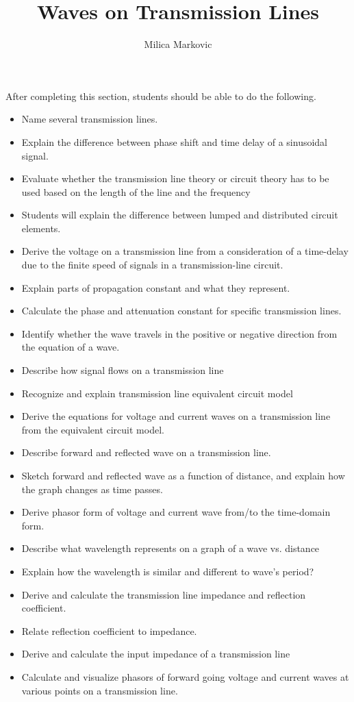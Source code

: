 \documentclass{ximera}
\title{Waves on Transmission Lines}
\author{Milica Markovic}
\begin{document}
\begin{abstract}
\end{abstract}

\maketitle

\begin{sectionOutcomes}

After completing this section, students should be able to do the following.

\begin{itemize}
\item Name several transmission lines.
\item Explain the difference between phase shift and time delay of a sinusoidal signal.
\item Evaluate whether the transmission line theory or circuit theory has to be used based on the length of the line and the frequency
\item Students will explain the difference between lumped and distributed circuit elements.
\item Derive the voltage on a transmission line from a consideration of a time-delay due to the finite speed of signals in a transmission-line circuit.
\item Explain parts of propagation constant and what they represent.
\item Calculate the phase and attenuation constant for specific transmission lines.
\item Identify whether the wave travels in the positive or negative direction from the equation of a wave.
\item Describe how signal flows on a transmission line
\item Recognize and explain transmission line equivalent circuit model
\item Derive the equations for voltage and current waves on a transmission line from the equivalent circuit model.
\item Describe forward and reflected wave on a transmission line.
\item Sketch forward and reflected wave as a function of distance, and explain how the graph changes as time passes.
\item Derive phasor form of voltage and current wave from/to the time-domain form.
\item Describe what wavelength represents on a graph of a wave vs. distance
\item Explain how the wavelength is similar and different to wave’s period?
\item Derive and calculate the transmission line impedance and reflection coefficient.
\item Relate reflection coefficient to impedance.
\item Derive and calculate the input impedance of a transmission line
\item Calculate and visualize phasors of forward going voltage and current waves at various points on a transmission line.
\end{itemize}

\end{sectionOutcomes}
\end{document}
